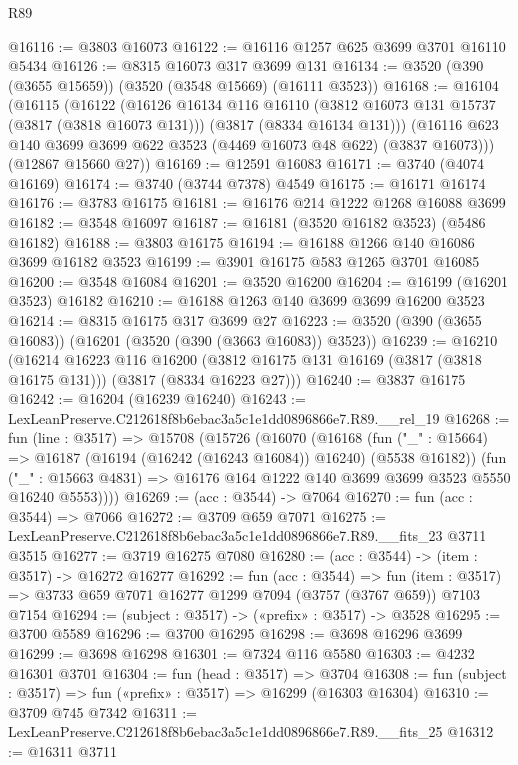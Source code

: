\begin{lexlean}{R89}
\begin{coremodule}
@16116 := @3803 @16073
@16122 := @16116 @1257 @625 @3699 @3701 @16110 @5434
@16126 := @8315 @16073 @317 @3699 @131
@16134 := @3520 (@390 (@3655 @15659)) (@3520 (@3548 @15669) (@16111 @3523))
@16168 := @16104
    (@16115
      (@16122
        (@16126
          @16134
          @116
          @16110
          (@3812 @16073 @131 @15737 (@3817 (@3818 @16073 @131)))
          (@3817 (@8334 @16134 @131)))
        (@16116 @623 @140 @3699 @3699 @622 @3523 (@4469 @16073 @48 @622) (@3837 @16073)))
      (@12867 @15660 @27))
@16169 := @12591 @16083
@16171 := @3740 (@4074 @16169)
@16174 := @3740 (@3744 @7378) @4549
@16175 := @16171 @16174
@16176 := @3783 @16175
@16181 := @16176 @214 @1222 @1268 @16088 @3699
@16182 := @3548 @16097
@16187 := @16181 (@3520 @16182 @3523) (@5486 @16182)
@16188 := @3803 @16175
@16194 := @16188 @1266 @140 @16086 @3699 @16182 @3523
@16199 := @3901 @16175 @583 @1265 @3701 @16085
@16200 := @3548 @16084
@16201 := @3520 @16200
@16204 := @16199 (@16201 @3523) @16182
@16210 := @16188 @1263 @140 @3699 @3699 @16200 @3523
@16214 := @8315 @16175 @317 @3699 @27
@16223 := @3520 (@390 (@3655 @16083)) (@16201 (@3520 (@390 (@3663 @16083)) @3523))
@16239 := @16210
    (@16214
      @16223
      @116
      @16200
      (@3812 @16175 @131 @16169 (@3817 (@3818 @16175 @131)))
      (@3817 (@8334 @16223 @27)))
@16240 := @3837 @16175
@16242 := @16204 (@16239 @16240)
@16243 := LexLeanPreserve.C212618f8b6ebac3a5c1e1dd0896866e7.R89.__rel_19
@16268 := fun (line : @3517) =>
  @15708
    (@15726
      (@16070
        (@16168
          (fun ("_" : @15664) => @16187 (@16194 (@16242 (@16243 @16084)) @16240) (@5538 @16182))
          (fun ("_" : @15663 @4831) =>
          @16176 @164 @1222 @140 @3699 @3699 @3523 @5550 @16240 @5553))))
@16269 := (acc : @3544) -> @7064
@16270 := fun (acc : @3544) => @7066
@16272 := @3709 @659 @7071
@16275 := LexLeanPreserve.C212618f8b6ebac3a5c1e1dd0896866e7.R89.__fits_23 @3711 @3515
@16277 := @3719 @16275 @7080
@16280 := (acc : @3544) -> (item : @3517) -> @16272 @16277
@16292 := fun (acc : @3544) =>
  fun (item : @3517) => @3733 @659 @7071 @16277 @1299 @7094 (@3757 (@3767 @659)) @7103 @7154
@16294 := (subject : @3517) -> («prefix» : @3517) -> @3528
@16295 := @3700 @5589
@16296 := @3700 @16295
@16298 := @3698 @16296 @3699
@16299 := @3698 @16298
@16301 := @7324 @116 @5580
@16303 := @4232 @16301 @3701
@16304 := fun (head : @3517) => @3704
@16308 := fun (subject : @3517) => fun («prefix» : @3517) => @16299 (@16303 @16304)
@16310 := @3709 @745 @7342
@16311 := LexLeanPreserve.C212618f8b6ebac3a5c1e1dd0896866e7.R89.__fits_25
@16312 := @16311 @3711

\end{coremodule}
\end{lexlean}
